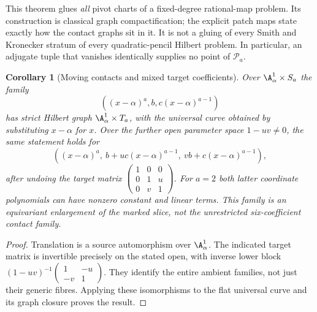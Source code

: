 \documentclass[11pt,reqno]{amsart}
\numberwithin{equation}{section}
\newtheorem{corollary}[theorem]{Corollary}
\theoremstyle{definition}\newtheorem{definition}[theorem]{Definition}
\theoremstyle{remark}\newtheorem{remark}[theorem]{Remark}
\begin{document}
This theorem glues \emph{all} pivot charts of a fixed-degree rational-map
problem. Its construction is classical graph compactification; the
explicit patch maps state exactly how the contact graphs sit in it.
It is not a gluing of every Smith and Kronecker stratum of every
quadratic-pencil Hilbert problem. In particular, an adjugate tuple that
vanishes identically supplies no point of $\mathcal P_a$.

\begin{corollary}[Moving contacts and mixed target coefficients]
\label{cor:moving-v169}
Over $\A^1_\alpha\times S_a$ the family
\[
 ((x-\alpha)^a,b,c(x-\alpha)^{a-1})
\]
has strict Hilbert graph $\A^1_\alpha\times T_a$, with the universal
curve obtained by substituting $x-\alpha$ for $x$. Over the further
open parameter space $1-uv\ne0$, the same statement holds for
\begin{equation}\label{eq:mixed-family-v169}
 ((x-\alpha)^a,\ b+uc(x-\alpha)^{a-1},\ vb+c(x-\alpha)^{a-1}),
\end{equation}
after undoing the target matrix
$\left(\begin{smallmatrix}1&0&0\\0&1&u\\0&v&1\end{smallmatrix}\right)$.
For $a=2$ both latter coordinate polynomials can have nonzero constant
and linear terms. This family is an equivariant enlargement of the
marked slice, not the unrestricted six-coefficient contact family.
\end{corollary}
\begin{proof}
Translation is a source automorphism over $\A^1_\alpha$. The indicated
target matrix is invertible precisely on the stated open, with inverse
lower block $(1-uv)^{-1}\left(\begin{smallmatrix}1&-u\\-v&1\end{smallmatrix}\right)$.
They identify the entire ambient families, not just their generic
fibres. Applying these isomorphisms to the flat universal curve and
its graph closure proves the result.
\end{proof}
\end{document}
